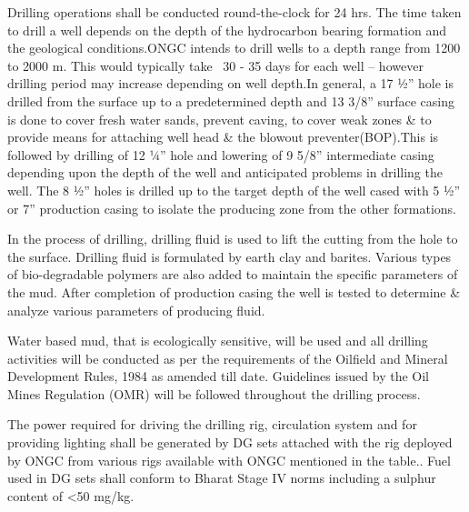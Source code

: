 \documentclass[11pt,a4paper]{article}
\begin{document}
Drilling operations shall be conducted round-the-clock for 24 hrs. The time taken to drill a well depends on the depth of the hydrocarbon bearing formation and the geological conditions.ONGC intends to drill wells to a depth range from 1200 to 2000 m. This would typically take ~30 - 35 days for each well – however drilling period may increase depending on well depth.In general, a 17 1⁄2” hole is drilled from the surface up to a predetermined depth and 13 3/8” surface casing is done to cover fresh water sands, prevent caving, to cover weak zones \& to provide means for attaching well head \& the blowout preventer(BOP).This is followed by drilling of 12 1⁄4” hole and lowering of 9 5/8” intermediate casing depending upon the depth of the well and anticipated problems in drilling the well. The 8 1⁄2” holes is drilled up to the target depth of the well cased with 5 1⁄2” or 7” production casing to isolate the producing zone from the other formations.

In the process of drilling, drilling fluid is used to lift the cutting from the hole to the surface. Drilling fluid is formulated by earth clay and barites. Various types of bio-degradable polymers are also added to maintain the specific parameters of the mud. After completion of production casing the well is tested to determine \& analyze various parameters of producing fluid.

Water based mud, that is ecologically sensitive, will be used and all drilling activities will be conducted as per the requirements of the Oilfield and Mineral Development Rules, 1984 as amended till date. Guidelines issued by the Oil Mines Regulation (OMR) will be followed throughout the drilling process.

The power required for driving the drilling rig, circulation system and for providing lighting shall be generated by DG sets attached with the rig deployed by ONGC from various rigs available with ONGC mentioned in the table.. Fuel used in DG sets shall conform to Bharat Stage IV norms including a sulphur content of <50 mg/kg.


\newpage
\end{document}
